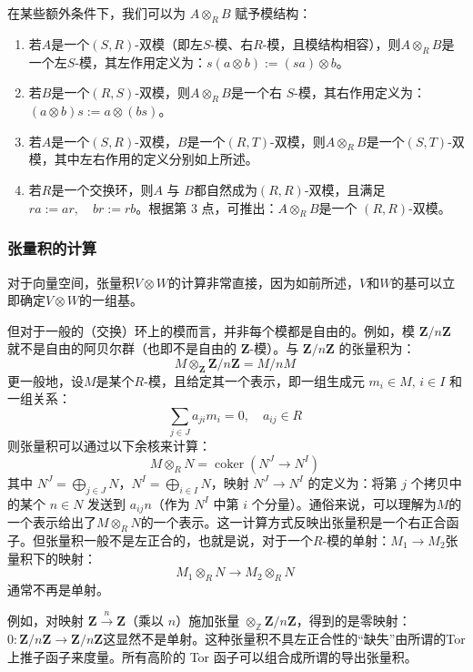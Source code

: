 在某些额外条件下，我们可以为 \( A \otimes_R B \) 赋予模结构：

\begin{enumerate}
\item 若\( A \)是一个\( (S, R) \)-双模（即左\( S \)-模、右\( R \)-模，且模结构相容），则\(A \otimes_R B\)是一个左\( S \)-模，其左作用定义为：\(s(a \otimes b) := (sa) \otimes b\)。
\item 若\( B \)是一个\( (R, S) \)-双模，则\(A \otimes_R B\)是一个右 \( S \)-模，其右作用定义为：\((a \otimes b)s := a \otimes (bs)\)。
\item 若\( A \)是一个\( (S, R) \)-双模，\( B \)是一个\( (R, T) \)-双模，则\(A \otimes_R B \)是一个\( (S, T) \)-双模，其中左右作用的定义分别如上所述。
\item 若\( R \)是一个交换环，则\( A \) 与 \( B \)都自然成为\( (R, R) \)-双模，且满足\(ra := ar, \quad br := rb\)。根据第 3 点，可推出：\(A \otimes_R B\)是一个 \( (R, R) \)-双模。
\end{enumerate}
\subsubsection{张量积的计算}
对于向量空间，张量积\( V \otimes W \)的计算非常直接，因为如前所述，\( V \)和\( W \)的基可以立即确定\( V \otimes W \)的一组基。

但对于一般的（交换）环上的模而言，并非每个模都是自由的。例如，模 \( \mathbf{Z}/n\mathbf{Z} \) 就不是自由的阿贝尔群（也即不是自由的 \( \mathbf{Z} \)-模）。与 \( \mathbf{Z}/n\mathbf{Z} \) 的张量积为：
\[
M \otimes_{\mathbf{Z}} \mathbf{Z}/n\mathbf{Z} = M / nM~
\]
更一般地，设\( M \)是某个\( R \)-模，且给定其一个表示，即一组生成元 \( m_i \in M,\, i \in I \) 和一组关系：
\[
\sum_{j \in J} a_{ji} m_i = 0,\quad a_{ij} \in R~
\]
则张量积可以通过以下余核来计算：
\[
M \otimes_R N = \operatorname{coker}(N^J \to N^I)~
\]
其中 \( N^J = \bigoplus_{j \in J} N \)，\( N^I = \bigoplus_{i \in I} N \)，映射 \( N^J \to N^I \) 的定义为：将第 \( j \) 个拷贝中的某个 \( n \in N \) 发送到 \( a_{ij} n \)（作为 \( N^I \) 中第 \( i \) 个分量）。通俗来说，可以理解为\( M \)的一个表示给出了\( M \otimes_R N \)的一个表示。这一计算方式反映出张量积是一个右正合函子。但张量积一般不是左正合的，也就是说，对于一个\( R \)-模的单射：\(M_1 \to M_2\)张量积下的映射：
\[
M_1 \otimes_R N \to M_2 \otimes_R N~
\]
通常不再是单射。

例如，对映射 \( \mathbf{Z} \xrightarrow{n} \mathbf{Z} \)（乘以 \( n \)）施加张量 \( \otimes_{\mathbb{Z}} \mathbf{Z}/n\mathbf{Z} \)，得到的是零映射：\(0 : \mathbf{Z}/n\mathbf{Z} \to \mathbf{Z}/n\mathbf{Z}\)这显然不是单射。这种张量积不具左正合性的“缺失”由所谓的Tor 上推子函子来度量。所有高阶的 Tor 函子可以组合成所谓的导出张量积。




